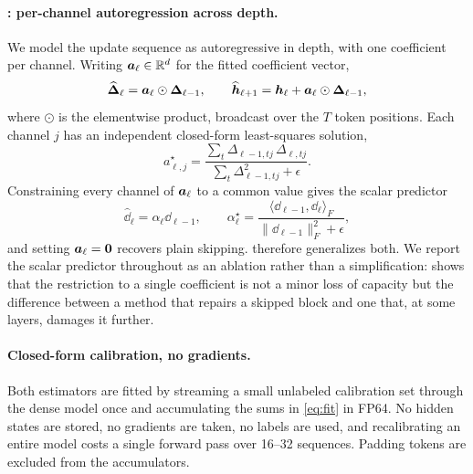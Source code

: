 \paragraph{\mname: per-channel autoregression across depth.} We model the update
sequence as autoregressive in depth, with one coefficient per channel. Writing
$\bm{a}_\ell \in \mathbb{R}^{d}$ for the fitted coefficient vector,
\begin{equation}
\widehat{\bm{\Delta}}_\ell = \bm{a}_\ell \odot \bm{\Delta}_{\ell-1},
\qquad
\widehat{\bm{h}}_{\ell+1} = \bm{h}_\ell + \bm{a}_\ell \odot \bm{\Delta}_{\ell-1},
\label{eq:diag}
\end{equation}
where $\odot$ is the elementwise product, broadcast over the $T$ token positions.
Each channel $j$ has an independent closed-form least-squares solution,
\begin{equation}
a^{\star}_{\ell,j} =
\frac{\sum_t \Delta_{\ell-1,tj}\,\Delta_{\ell,tj}}
     {\sum_t \Delta_{\ell-1,tj}^{2} + \epsilon}.
\label{eq:fit}
\end{equation}
Constraining every channel of $\bm{a}_\ell$ to a common value gives the scalar
predictor
\begin{equation}
\widehat{\dd}_\ell = \alpha_\ell \dd_{\ell-1},
\qquad
\alpha^{\star}_\ell =
\frac{\langle \dd_{\ell-1}, \dd_\ell \rangle_F}
     {\|\dd_{\ell-1}\|_F^2 + \epsilon},
\label{eq:ar1}
\end{equation}
and setting $\bm{a}_\ell = \bm{0}$ recovers plain skipping. \mname therefore
generalizes both. We report the scalar predictor throughout as an ablation rather
than a simplification:  shows that the restriction to a
single coefficient is not a minor loss of capacity but the difference between a
method that repairs a skipped block and one that, at some layers, damages it
further.

\paragraph{Closed-form calibration, no gradients.} Both estimators are fitted by
streaming a small unlabeled calibration set through the dense model once and
accumulating the sums in \cref{eq:fit} in FP64. No hidden states are stored, no
gradients are taken, no labels are used, and recalibrating an entire model costs a
single forward pass over 16--32 sequences. Padding tokens are excluded from
the accumulators.


